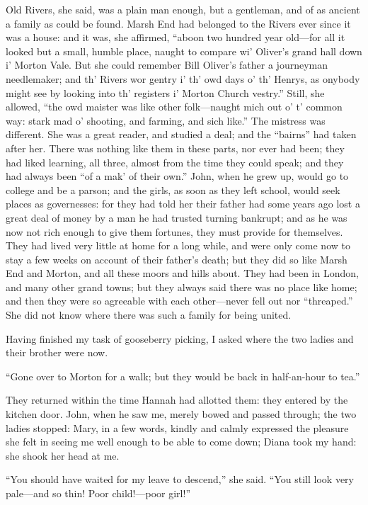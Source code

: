 Old \Mr{} Rivers, she said, was a plain man enough, but a gentleman, and
of as ancient a family as could be found. Marsh End had belonged to the
Rivers ever since it was a house: and it was, she affirmed,
\enquote{aboon two hundred year old---for all it looked but a small,
	humble place, naught to compare wi' \Mr{} Oliver's grand hall down i'
	Morton Vale. But she could remember Bill Oliver's father a journeyman
	needlemaker; and th' Rivers wor gentry i' th' owd days o' th' Henrys, as
	onybody might see by looking into th' registers i' Morton Church
	vestry.} Still, she allowed, \enquote{the owd maister was like other
	folk---naught mich out o' t' common way: stark mad o' shooting, and
	farming, and sich like.} The mistress was different. She was a great
reader, and studied a deal; and the \enquote{bairns} had taken after
her. There was nothing like them in these parts, nor ever had been;
they had liked learning, all three, almost from the time they could
speak; and they had always been \enquote{of a mak' of their own.} \Mr{}
\St{} John, when he grew up, would go to college and be a parson; and the
girls, as soon as they left school, would seek places as governesses:
for they had told her their father had some years ago lost a great deal
of money by a man he had trusted turning bankrupt; and as he was now not
rich enough to give them fortunes, they must provide for themselves.
They had lived very little at home for a long while, and were only come
now to stay a few weeks on account of their father's death; but they did
so like Marsh End and Morton, and all these moors and hills about. They
had been in London, and many other grand towns; but they always said
there was no place like home; and then they were so agreeable with each
other---never fell out nor \enquote{threaped.} She did not know where
there was such a family for being united.

Having finished my task of gooseberry picking, I asked where the two
ladies and their brother were now.

\enquote{Gone over to Morton for a walk; but they would be back in
	half-an-hour to tea.}

They returned within the time Hannah had allotted them: they entered by
the kitchen door. \Mr{} \St{} John, when he saw me, merely bowed and passed
through; the two ladies stopped: Mary, in a few words, kindly and calmly
expressed the pleasure she felt in seeing me well enough to be able to
come down; Diana took my hand: she shook her head at me.

\enquote{You should have waited for my leave to descend,} she said.
\enquote{You still look very pale---and so thin! Poor child!---poor
	girl!}

